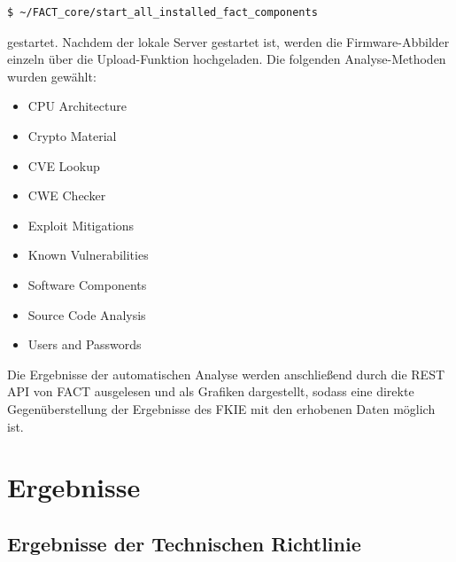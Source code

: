 \documentclass[a4paper]{book}
\begin{document}
\begin{large}
\begin{onehalfspace}
\begin{lstlisting}[language=sh,caption={Befehl zum starten alle Komponenten von FACT}]
$ ~/FACT_core/start_all_installed_fact_components
\end{lstlisting}

\noindent gestartet. Nachdem der lokale Server gestartet ist, werden die Firmware-Abbilder einzeln über die Upload-Funktion hochgeladen. Die folgenden Analyse-Methoden wurden gewählt:
\end{onehalfspace}

\begin{itemize}
\item CPU Architecture
\item Crypto Material
\item CVE Lookup
\item CWE Checker
\item Exploit Mitigations
\item Known Vulnerabilities
\item Software Components
\item Source Code Analysis
\item Users and Passwords
\end{itemize}
\begin{onehalfspace}
\noindent Die Ergebnisse der automatischen Analyse werden anschließend durch die REST API von FACT ausgelesen und als Grafiken dargestellt, sodass eine direkte Gegenüberstellung der Ergebnisse des FKIE mit den erhobenen Daten möglich ist. 

\end{onehalfspace}








\chapter{Ergebnisse}
\section{Ergebnisse der Technischen Richtlinie}
\label{erg_tr}


\end{large}
\end{document}
